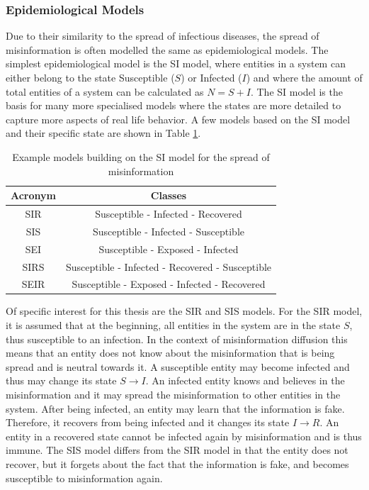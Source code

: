 \subsubsection{Epidemiological Models}

Due to their similarity to the spread of infectious diseases, 
the spread of misinformation is often modelled the same as epidemiological models.
The simplest epidemiological model is the SI model, where entities in a system
can either belong to the state \glqq Susceptible\grqq{} ($S$) or 
\glqq Infected\grqq{} ($I$) and where the amount of total entities of a 
system can be calculated as $N=S+I$. The SI model is the basis for many
more specialised models where the states are more detailed to capture more 
aspects of real life behavior. A few models based on the SI model and their 
specific state are shown in Table \ref{SI-table}.

\begin{table}[ht!]
    \centering
    \begin{tabular}{|c | c |} 
     \hline
     Acronym & Classes  \\ 
     \hline
     SIR & Susceptible - Infected - Recovered  \\ 
     \hline
     SIS & Susceptible - Infected - Susceptible \\
     \hline
     SEI & Susceptible - Exposed - Infected \\
     \hline
     SIRS & Susceptible - Infected - Recovered - Susceptible \\
     \hline
     SEIR & Susceptible - Exposed - Infected - Recovered \\
     \hline
    \end{tabular}
    \caption{Example models building on the SI 
    model for the spread of misinformation \cite{reviewinformationdiffusion}}
    \label{SI-table}
\end{table}

Of specific interest for this thesis are the SIR and SIS models. 
For the SIR model, it is assumed that at the beginning, all entities in the 
system are in the state $S$, thus susceptible to an infection. In the context of 
misinformation diffusion this means that an entity does not know about the
misinformation that is being spread and is neutral towards it. A susceptible
entity may become infected and thus may change its state $S\to I$.
An infected entity knows and believes in the misinformation and it may
spread the misinformation to other entities in the system. After being infected,
an entity may learn that the information is fake. Therefore, it recovers 
from being infected and it changes its state $I\to R$. An entity in a 
recovered state cannot be infected again by misinformation and is thus immune.
The SIS model differs from the SIR model in that the entity does not recover,
but it \glqq forgets\grqq{} about the fact that the information is fake, 
and becomes susceptible to misinformation again.


